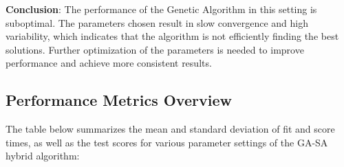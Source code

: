 \documentclass{article}
\begin{document}
    \textbf{Conclusion}: The performance of the Genetic Algorithm in this setting is suboptimal. The parameters chosen result in slow convergence and high variability, which indicates that the algorithm is not efficiently finding the best solutions. Further optimization of the parameters is needed to improve performance and achieve more consistent results.

    \subsection{Performance Metrics Overview}

    The table below summarizes the mean and standard deviation of fit and score times, as well as the test scores for various parameter settings of the GA-SA hybrid algorithm:

    \begin{table}[H]
        \centering
\end{table}
\end{document}
